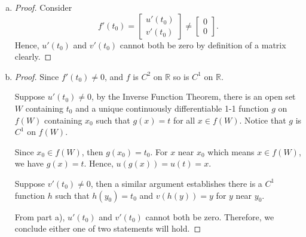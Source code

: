 \begin{Exercise}
\begin{enumerate}[a)]
\item
\begin{proof}
Consider
$$
f'(t_0) = \begin{bmatrix}
u'(t_0) \\
v'(t_0)
\end{bmatrix} 
\neq
\begin{bmatrix}
0 \\
0
\end{bmatrix}.
$$
Hence, $u'(t_0)$ and $v'(t_0)$ cannot both be zero by definition of a matrix clearly.
\end{proof}

\item
\begin{proof}
Since $f'(t_0)\neq 0$, and $f$ is $C^2$ on $\mathbb{R}$ so is $C^1$ on $\mathbb{R}$. 

Suppose $u'(t_0)\neq 0$, by the Inverse Function Theorem, there is an open set $W$ containing $t_0$ and a unique continuously differentiable 1-1 function $g$ on $f(W)$ containing $x_0$ such that $g(x) = t$ for all $x\in f(W)$. Notice that $g$ is $C^1$ on $f(W)$.

Since $x_0 \in f(W)$, then $g(x_0) = t_0$. For $x$ near $x_0$ which means $x\in f(W)$, we have $g(x) = t$. Hence,
$u(g(x)) = u(t) = x$.

Suppose $v'(t_0)\neq 0$, then a similar argument establishes there is a $C^1$ function $h$ such that $h(y_0)=t_0$ and $v(h(y)) = y$ for $y$ near $y_0$.

From part a), $u'(t_0)$ and $v'(t_0)$ cannot both be zero. Therefore, we conclude either one of two statements will hold.
\end{proof}
\end{enumerate}
\end{Exercise}